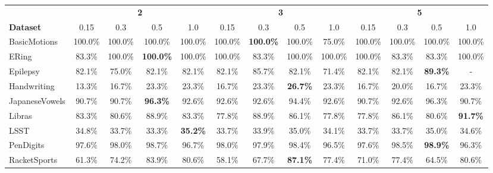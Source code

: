 \begin{tabular}{lcccccccccccc}
\toprule
{}                        & \multicolumn{4}{c}{\textbf{2}}    & \multicolumn{4}{c}{\textbf{3}}    & \multicolumn{4}{c}{\textbf{5}}  \\
\cmidrule(lr){2-5} \cmidrule(lr){6-9} \cmidrule(lr){10-13}
\textbf{Dataset}          & 0.15   & 0.3    & 0.5    & 1.0    & 0.15   & 0.3    & 0.5    & 1.0    & 0.15   & 0.3    & 0.5    & 1.0 \\
\midrule
BasicMotions              &                100.0\% &     100.0\% &     100.0\% &     100.0\% &      100.0\% &     \textbf{100.0\%} &     100.0\% &      75.0\% &      100.0\% &     100.0\% &     100.0\% &     100.0\% \\
ERing                     &                 83.3\% &     100.0\% &     \textbf{100.0\%} &     100.0\% &      100.0\% &      83.3\% &     100.0\% &     100.0\% &      100.0\% &      83.3\% &      83.3\% &     100.0\% \\
Epilepsy                  &                 82.1\% &      75.0\% &      82.1\% &      82.1\% &       82.1\% &      85.7\% &      82.1\% &      71.4\% &       82.1\% &      82.1\% &      \textbf{89.3\%} &         - \\
Handwriting               &                 13.3\% &      16.7\% &      23.3\% &      23.3\% &       16.7\% &      23.3\% &      \textbf{26.7\%} &      23.3\% &       16.7\% &      20.0\% &      16.7\% &      23.3\% \\
JapaneseVowels            &                 90.7\% &      90.7\% &      \textbf{96.3\%} &      92.6\% &       92.6\% &      92.6\% &      94.4\% &      92.6\% &       90.7\% &      92.6\% &      96.3\% &      90.7\% \\
Libras                    &                 83.3\% &      80.6\% &      88.9\% &      83.3\% &       77.8\% &      88.9\% &      86.1\% &      77.8\% &       77.8\% &      86.1\% &      80.6\% &      \textbf{91.7\%} \\
LSST                      &                 34.8\% &      33.7\% &      33.3\% &      \textbf{35.2\%} &       33.7\% &      33.9\% &      35.0\% &      34.1\% &       33.7\% &      33.7\% &      35.0\% &      34.6\% \\
PenDigits                 &                 97.6\% &      98.0\% &      98.7\% &      96.7\% &       98.0\% &      97.9\% &      98.4\% &      96.5\% &       97.6\% &      98.5\% &      \textbf{98.9\%} &      96.3\% \\
RacketSports              &                 61.3\% &      74.2\% &      83.9\% &      80.6\% &       58.1\% &      67.7\% &      \textbf{87.1\%} &      77.4\% &       71.0\% &      77.4\% &      64.5\% &      80.6\% \\
\bottomrule
\end{tabular}
